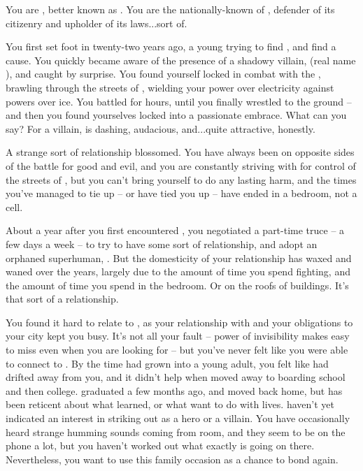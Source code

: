 \documentclass[char]{LRSguildcamp1}
\begin{document}
\name{\cOS{}}
You are \cOS{\intro}, better known as \cOS{\MYsupername}.  You are the nationally-known \cOS{\hero} of \pCityO{}, defender of its citizenry and upholder of its laws...sort of.

You first set foot in \pCityO{} twenty-two years ago, a young \cOS{\hero} trying to find \cOS{\themself}, and find a cause.  You quickly became aware of the presence of a shadowy villain, \cOldest{\MYsupername} (real name \cOldest{\intro}), and caught \cOldest{\them} by surprise.  %
You found yourself locked in combat with the \cOldest{\villain}, brawling through the streets of \pCityO{}, wielding your power over electricity against \cOldest{\their} powers over ice.  You battled for hours, until you finally wrestled \cOldest{\them} to the ground -- and then you found yourselves locked into a passionate embrace.  What can you say?  For a villain, \cOldest{} is dashing, audacious, and...quite attractive, honestly.

A strange sort of relationship blossomed.  You have always been on opposite sides of the battle for good and evil, and you are constantly striving with \cOS{\them} for control of the streets of \pCityO{}, but you can't bring yourself to do \cOS{\them} any lasting harm, and the times you've managed to tie \cOS{\them} up -- or \cOS{\they} have tied you up -- have ended in a bedroom, not a cell.

About a year after you first encountered \cOldest{}, you negotiated a part-time truce -- a few days a week -- to try to have some sort of relationship, and adopt an orphaned superhuman, \cGrad{}.  
But the domesticity of your relationship has waxed and waned over the years, largely due to the amount of time you spend fighting, and the amount of time you spend in the bedroom.  
Or on the roofs of buildings.  
It's that sort of a relationship.

You found it hard to relate to \cGrad{}, as your relationship with \cOldest{} and your obligations to your city kept you busy.
It's not all your fault -- \cGrad{\their} power of invisibility makes \cGrad{\them} easy to miss even when you are looking for \cGrad{\them} -- but you've never felt like you were able to connect to \cGrad{\them}.  
By the time \cGrad{\they} had grown into a young adult, you felt like \cGrad{} had drifted away from you, and it didn't help when \cGrad{\they} moved away to boarding school and then college.
\cGrad{\They} graduated a few months ago, and moved back home, but has been reticent about what \cGrad{\they} learned, or what \cGrad{\they} want to do with \cGrad{\their} lives.  \cGrad{\They} haven't yet indicated an interest in striking out as a hero or a villain.  
You have occasionally heard strange humming sounds coming from \cGrad{\their} room, and they seem to be on the phone a lot, but you haven't worked out what exactly is going on there. %
Nevertheless, you want to use this family occasion as a chance to bond again.
\end{document}
